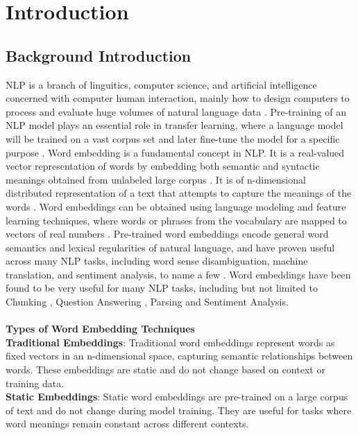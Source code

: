 \chapter{Introduction}
\section{Background Introduction}
NLP is a branch of linguitics, computer science, and artificial intelligence concerned with computer human interaction, mainly how to design computers to process and evaluate huge volumes of natural language data \cite{asudani2023impact}. Pre-training of an NLP model plays an essential role in transfer learning, where a language model will be trained on a vast corpus set and later fine-tune the model for a specific purpose \cite{NepaliBERT}. Word embedding is a fundamental concept in NLP. It is a real-valued vector representation of words by embedding both semantic and syntactic meanings obtained from unlabeled large corpus \cite{Wang_Wang_Chen_Wang_Kuo_2019}. It is of n-dimensional distributed representation of a text that attempts to capture the meanings of the words \cite{asudani2023impact}. Word embeddings can be obtained using language modeling and feature learning techniques, where words or phrases from the vocabulary are mapped to vectors of real numbers \cite{enwiki:1219561882}. Pre-trained word embeddings encode general word semantics and lexical regularities of natural language, and have proven useful across many NLP tasks, including word sense disambiguation, machine translation, and sentiment analysis, to name a few \cite{moreo2019wordclass}. Word embeddings have been found to be very useful for many NLP tasks, including but not limited to Chunking \cite{turian-etal-2010-word}, Question Answering \cite{questionanswer}, Parsing and Sentiment Analysis\cite{sentimentanalysis}. \cite{wordembedding} \\\\
\textbf{Types of Word Embedding Techniques} \cite{reviewOnWordEmbedding} \\
\textbf{Traditional Embeddings}: Traditional word embeddings represent words as fixed vectors in an n-dimensional space, capturing semantic relationships between words.
These embeddings are static and do not change based on context or training data. \\
\textbf{Static Embeddings}:
Static word embeddings are pre-trained on a large corpus of text and do not change during model training.
They are useful for tasks where word meanings remain constant across different contexts.\\
